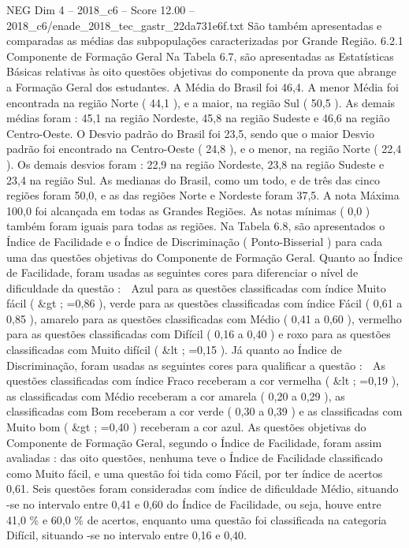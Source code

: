 \begin{textsample}{NEG Dim 4 – 2018\_c6 – Score 12.00 – 2018\_c6/enade\_2018\_tec\_gastr\_22da731e6f.txt}
São também apresentadas e comparadas as médias das subpopulações caracterizadas por Grande Região. 6.2.1 Componente de Formação Geral Na Tabela 6.7, são apresentadas as Estatísticas Básicas relativas às oito questões objetivas do componente da prova que abrange a Formação Geral dos estudantes.
A Média do Brasil foi 46,4.
A menor Média foi encontrada na região Norte ( 44,1 ), e a maior, na região Sul ( 50,5 ).
As demais médias foram : 45,1 na região Nordeste, 45,8 na região Sudeste e 46,6 na região Centro-Oeste.
O Desvio padrão do Brasil foi 23,5, sendo que o maior Desvio padrão foi encontrado na Centro-Oeste ( 24,8 ), e o menor, na região Norte ( 22,4 ).
Os demais desvios foram : 22,9 na região Nordeste, 23,8 na região Sudeste e 23,4 na região Sul.
As medianas do Brasil, como um todo, e de três das cinco regiões foram 50,0, e as das regiões Norte e Nordeste foram 37,5.
A nota Máxima 100,0 foi alcançada em todas as Grandes Regiões.
As notas mínimas ( 0,0 ) também foram iguais para todas as regiões.
Na Tabela 6.8, são apresentados o Índice de Facilidade e o Índice de Discriminação ( Ponto-Bisserial ) para cada uma das questões objetivas do Componente de Formação Geral.
Quanto ao Índice de Facilidade, foram usadas as seguintes cores para diferenciar o nível de dificuldade da questão :  Azul para as questões classificadas com índice Muito fácil ( \&gt ; =0,86 ), verde para as questões classificadas com índice Fácil ( 0,61 a 0,85 ), amarelo para as questões classificadas com Médio ( 0,41 a 0,60 ), vermelho para as questões classificadas com Difícil ( 0,16 a 0,40 ) e roxo para as questões classificadas com Muito difícil ( \&lt ; =0,15 ).
Já quanto ao Índice de Discriminação, foram usadas as seguintes cores para qualificar a questão :  As questões classificadas com índice Fraco receberam a cor vermelha ( \&lt ; =0,19 ), as classificadas com Médio receberam a cor amarela ( 0,20 a 0,29 ), as classificadas com Bom receberam a cor verde ( 0,30 a 0,39 ) e as classificadas com Muito bom ( \&gt ; =0,40 ) receberam a cor azul.
As questões objetivas do Componente de Formação Geral, segundo o Índice de Facilidade, foram assim avaliadas : das oito questões, nenhuma teve o Índice de Facilidade classificado como Muito fácil, e uma questão foi tida como Fácil, por ter índice de acertos 0,61.
Seis questões foram consideradas com índice de dificuldade Médio, situando -se no intervalo entre 0,41 e 0,60 do Índice de Facilidade, ou seja, houve entre 41,0 \% e 60,0 \% de acertos, enquanto uma questão foi classificada na categoria Difícil, situando -se no intervalo entre 0,16 e 0,40.

\end{textsample}
